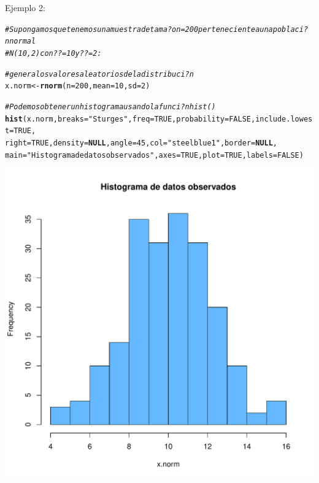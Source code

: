 \documentclass[10pt,a4paper]{article}\usepackage[]{graphicx}\usepackage[]{color}
\makeatletter
\def\maxwidth{ %
  \ifdim\Gin@nat@width>\linewidth
    \linewidth
  \else
    \Gin@nat@width
  \fi
}
\newcommand{\hlnum}[1]{\textcolor[rgb]{0.686,0.059,0.569}{#1}}%
\newcommand{\hlstr}[1]{\textcolor[rgb]{0.192,0.494,0.8}{#1}}%
\newcommand{\hlcom}[1]{\textcolor[rgb]{0.678,0.584,0.686}{\textit{#1}}}%
\newcommand{\hlstd}[1]{\textcolor[rgb]{0.345,0.345,0.345}{#1}}%
\newcommand{\hlkwa}[1]{\textcolor[rgb]{0.161,0.373,0.58}{\textbf{#1}}}%
\newcommand{\hlkwb}[1]{\textcolor[rgb]{0.69,0.353,0.396}{#1}}%
\newcommand{\hlkwc}[1]{\textcolor[rgb]{0.333,0.667,0.333}{#1}}%
\newcommand{\hlkwd}[1]{\textcolor[rgb]{0.737,0.353,0.396}{\textbf{#1}}}%
\newenvironment{kframe}{%
 \def\at@end@of@kframe{}%
 \ifinner\ifhmode%
  \def\at@end@of@kframe{\end{minipage}}%
  \begin{minipage}{\columnwidth}%
 \fi\fi%
 \def\FrameCommand##1{\hskip\@totalleftmargin \hskip-\fboxsep
 \colorbox{shadecolor}{##1}\hskip-\fboxsep
     \hskip-\linewidth \hskip-\@totalleftmargin \hskip\columnwidth}%
 \MakeFramed {\advance\hsize-\width
   \@totalleftmargin\z@ \linewidth\hsize
   \@setminipage}}%
 {\par\unskip\endMakeFramed%
 \at@end@of@kframe}
\newenvironment{knitrout}{}{} %
\makeatother
\begin{document}
Ejemplo 2: 
\begin{knitrout}
\color{fgcolor}\begin{kframe}
\begin{alltt}
\hlcom{#Supongamos que tenemos una muestra de tama?on=200 perteneciente a una poblaci?n normal }
\hlcom{#N(10,2) con ??=10 y ??=2:}

\hlcom{#genera los valores aleatorios de la distribuci?n }
\hlstd{x.norm} \hlkwb{<-} \hlkwd{rnorm}\hlstd{(}\hlkwc{n}\hlstd{=}\hlnum{200}\hlstd{,}\hlkwc{mean}\hlstd{=}\hlnum{10}\hlstd{,} \hlkwc{sd}\hlstd{=}\hlnum{2}\hlstd{)}

\hlcom{# Podemos obtener un histograma usando la funci?n hist() }
\hlkwd{hist}\hlstd{(x.norm,} \hlkwc{breaks} \hlstd{=} \hlstr{"Sturges"}\hlstd{,} \hlkwc{freq} \hlstd{=} \hlnum{TRUE}\hlstd{,} \hlkwc{probability} \hlstd{=} \hlnum{FALSE}\hlstd{,} \hlkwc{include.lowest} \hlstd{=} \hlnum{TRUE}\hlstd{,}
\hlkwc{right}\hlstd{=} \hlnum{TRUE}\hlstd{,} \hlkwc{density} \hlstd{=} \hlkwa{NULL}\hlstd{,} \hlkwc{angle} \hlstd{=} \hlnum{45}\hlstd{,} \hlkwc{col} \hlstd{=} \hlstr{"steelblue1"}\hlstd{,} \hlkwc{border} \hlstd{=} \hlkwa{NULL}\hlstd{,}
\hlkwc{main} \hlstd{=} \hlstr{"Histograma de datos observados"}\hlstd{,} \hlkwc{axes} \hlstd{=} \hlnum{TRUE}\hlstd{,} \hlkwc{plot} \hlstd{=} \hlnum{TRUE}\hlstd{,} \hlkwc{labels} \hlstd{=} \hlnum{FALSE}\hlstd{)}
\end{alltt}
\end{kframe}
\includegraphics[width=\maxwidth]{figure/unnamed-chunk-5-1} 

\end{knitrout}
\end{document}
